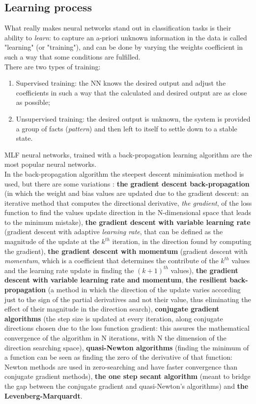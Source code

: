 \documentclass[../main.tex]{subfiles}
\begin{document}
\subsection{Learning process}
What really makes neural networks stand out in classification tasks is their ability to \textit{learn}: to capture an a-priori unknown information in the data is called "learning" (or "training"), and can be done by varying the weights coefficient in such a way that some conditions are fulfilled. \cite{Svozil1997} \\ 
There are two types of training: 
\begin{enumerate}
	\item Supervised training: the NN knows the desired output and adjust the coefficients in such a way that the calculated and desired output are as close as possible;
	\item Unsupervised training: the desired output is unknown, the system is provided a group of facts (\textit{pattern}) and then left to itself to settle down to a stable state.
\end{enumerate}
MLF neural networks, trained with a back-propagation learning algorithm are the most popular neural networks. \cite{Svozil1997} \\
In the back-propagation algorithm the steepest descent minimisation method is  used, but there are some variations \cite{Kuruvilla2014}: \textbf{the gradient descent back-propagation} (in which the weight and bias values are updated due to the gradient descent: an iterative method that computes the directional derivative, \textit{the gradient}, of the loss function to find the values update direction in the N-dimensional space that leads to the minimum mistake), \textbf{the gradient descent with variable learning rate} (gradient descent with adaptive \textit{learning rate}, that can be defined as the magnitude of the update at the $k^{th}$ iteration, in the direction found by computing the gradient), \textbf{the gradient descent with momentum} (gradient descent with \textit{momentum}, which is a coefficient that determines the contribute of the $k^{th}$ values and the learning rate update in finding the $(k+1)^{th}$ values), \textbf{the gradient descent with variable learning rate and momentum}, \textbf{the resilient back-propagation} (a method in which the direction of the update varies according just to the sign of the partial derivatives and not their value, thus eliminating the effect of their magnitude in the direction search), \textbf{conjugate gradient algorithms} (the step size is updated at every iteration, along conjugate directions chosen due to the loss function gradient: this assures the mathematical convergence of the algorithm in N iterations, with N the dimension of the direction searching space), \textbf{quasi-Newton algorithms} (finding the minimum of a function can be seen as finding the zero of the derivative of that function: Newton methods are used in zero-searching and have faster convergence than conjugate gradient methods), \textbf{the one step secant algorithm} (meant to bridge the gap between the conjugate gradient and quasi-Newton's algorithms) and \textbf{the Levenberg-Marquardt}.
\end{document}
